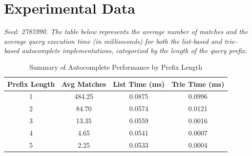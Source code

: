 \documentclass{article}
\begin{document}
\newpage
\section{Experimental Data}
\textit{Seed: 2785990. The table below represents the average number of matches and the average query execution time (in milliseconds) for both the list-based and trie-based autocomplete implementations, categorized by the length of the query prefix.}

\vspace{0.5cm}

\begin{table}[H]
    \centering
    \begin{tabular}{cccc}
        \toprule
        \textbf{Prefix Length} & \textbf{Avg Matches} & \textbf{List Time (ms)} & \textbf{Trie Time (ms)} \\
        \midrule
        1 & 484.25 & 0.0875 & 0.0996 \\
        2 & 84.70 & 0.0574 & 0.0121 \\
        3 & 13.35 & 0.0559 & 0.0016 \\
        4 & 4.65 & 0.0541 & 0.0007 \\
        5 & 2.25 & 0.0533 & 0.0004 \\
        \bottomrule
    \end{tabular}
    \caption{Summary of Autocomplete Performance by Prefix Length}
    \label{tab:exp_data}
\end{table}
\end{document}
